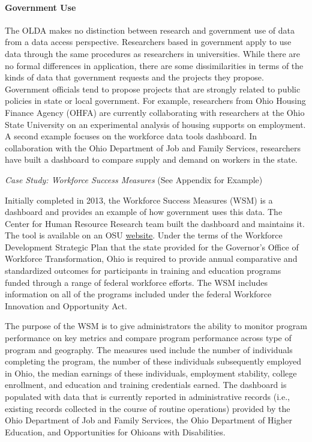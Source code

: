 \documentclass[
]{WileySix}
\begin{document}
\hypertarget{government-use}{%
\paragraph{Government Use}\label{government-use}}

The OLDA makes no distinction between research and government use of data from a data access perspective. Researchers based in government apply to use data through the same procedures as researchers in universities. While there are no formal differences in application, there are some dissimilarities in terms of the kinds of data that government requests and the projects they propose. Government officials tend to propose projects that are strongly related to public policies in state or local government. For example, researchers from Ohio Housing Finance Agency (OHFA) are currently collaborating with researchers at the Ohio State University on an experimental analysis of housing supports on employment. A second example focuses on the workforce data tools dashboard. In collaboration with the Ohio Department of Job and Family Services, researchers have built a dashboard to compare supply and demand on workers in the state.

\emph{Case Study: Workforce Success Measures} (See Appendix for Example)

Initially completed in 2013, the Workforce Success Measures (WSM) is a dashboard and provides an example of how government uses this data. The Center for Human Resource Research team built the dashboard and maintains it. The tool is available on an OSU \href{https://workforcesuccess.chrr.ohio-state.edu/home}{website}. Under the terms of the Workforce Development Strategic Plan that the state provided for the Governor's Office of Workforce Transformation, Ohio is required to provide annual comparative and standardized outcomes for participants in training and education programs funded through a range of federal workforce efforts. The WSM includes information on all of the programs included under the federal Workforce Innovation and Opportunity Act.

The purpose of the WSM is to give administrators the ability to monitor program performance on key metrics and compare program performance across type of program and geography. The measures used include the number of individuals completing the program, the number of these individuals subsequently employed in Ohio, the median earnings of these individuals, employment stability, college enrollment, and education and training credentials earned. The dashboard is populated with data that is currently reported in administrative records (i.e., existing records collected in the course of routine operations) provided by the Ohio Department of Job and Family Services, the Ohio Department of Higher Education, and Opportunities for Ohioans with Disabilities.
\end{document}
